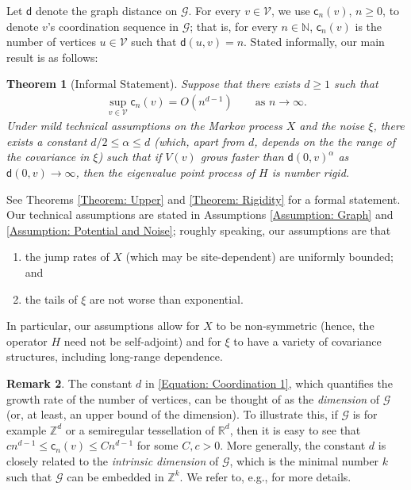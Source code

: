 \documentclass{amsart}
\numberwithin{equation}{section}
\newtheorem{theorem}{Theorem}[section]
\theoremstyle{definition}
\newtheorem{remark}[theorem]{Remark}
\newcommand\al{\alpha}
\newcommand\mbb{\mathbb}
\newcommand\ms{\mathscr}
\newcommand\msf{\mathsf}
\begin{document}
%

Let $\msf d$ denote the graph distance on $\ms G$.
For every $v\in\ms V$, we use $\msf c_n(v)$, $n\geq0$, to denote $v$'s coordination sequence
in $\ms G$; that is, for every $n\in\mbb N$,
$\msf c_n(v)$ is the number of vertices $u\in\ms V$ such that $\msf d(u,v)=n$. Stated informally,
our main result is as follows:

%

\begin{theorem}[Informal Statement]\label{thm:Informal}
Suppose that there exists $d\geq1$ such that
\begin{align}
\label{Equation: Coordination 1}
\sup_{v\in\ms V}\msf c_n(v)=O(n^{d-1})\qquad\text{as }n\to\infty.
\end{align}
Under mild technical assumptions on the Markov process $X$ and
the noise $\xi$,
there exists a constant $d/2\leq\al\leq d$ (which, apart from $d$, depends on the
the range of the covariance in $\xi$) such that if $V(v)$ grows
faster than $\msf d(0,v)^\al$ as $\msf d(0,v)\to\infty$,
then
the eigenvalue point process of $H$ is number rigid.
\end{theorem}



See Theorems \ref{Theorem: Upper}
and \ref{Theorem: Rigidity} for a formal statement.
Our technical assumptions are stated in Assumptions \ref{Assumption: Graph}
and \ref{Assumption: Potential and Noise}; roughly speaking,
our assumptions are that
\begin{enumerate}
\item the jump rates of $X$ (which may be site-dependent) are uniformly bounded; and
\item the tails of $\xi$ are not worse than exponential.
\end{enumerate}
In particular, our assumptions allow for $X$ to be non-symmetric
(hence, the operator $H$ need not be self-adjoint) and for $\xi$
to have a variety of covariance structures, including long-range
dependence.

%

\begin{remark}
\label{Remark: Dimension}
The constant $d$ in \eqref{Equation: Coordination 1}, which quantifies the growth rate of the number of vertices,
can be thought of as the {\it dimension} of $\ms G$ (or, at least, an upper bound of the dimension).
To illustrate this, if $\ms G$ is for example $\mbb Z^d$ or a semiregular tessellation of $\mbb R^d$,
then it is easy to see that $cn^{d-1}\leq \msf c_n(v)\leq Cn^{d-1}$ for some $C,c>0$. More generally,
the constant $d$ is closely related to the {\it intrinsic dimension} of $\ms G$, which is the minimal number
$k$ such that $\ms G$ can be embedded in $\mbb Z^k$. We refer to, e.g., \cite{KL07,LLR95} for more details.
\end{remark}
\end{document}
